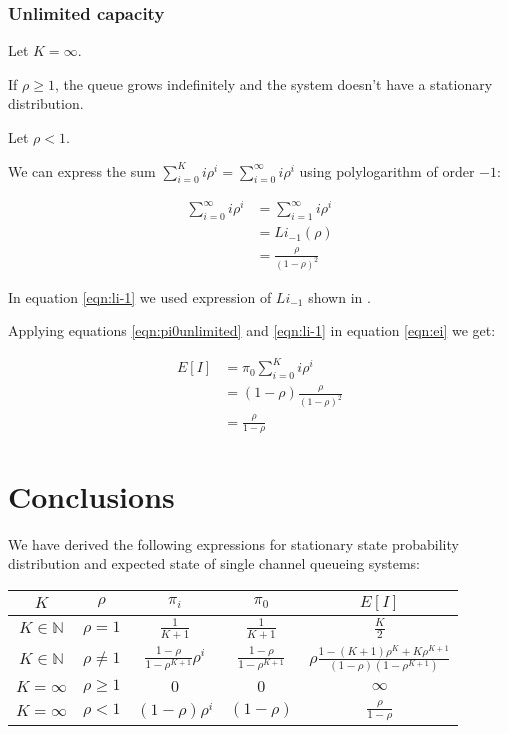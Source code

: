 \documentclass{article}
\begin{document}
\subsubsection{Unlimited capacity}

Let $K = \infty$.

If $\rho \geq 1$, the queue grows indefinitely
and the system doesn't have a stationary distribution.

Let $\rho < 1$.

We can express the sum
$\sum_{i=0}^K{i \rho^i} = \sum_{i=0}^\infty{i \rho^i}$
using polylogarithm of order $-1$:

\begin{align}
\sum_{i=0}^\infty{i \rho^i} &= \sum_{i=1}^\infty{i \rho^i} \\
&= Li_{-1}(\rho) \\
&= \frac{\rho}{(1 - \rho)^2} \label{eqn:li-1}
\end{align}

In equation \ref{eqn:li-1} we used expression of $Li_{-1}$ shown in \cite[section Particular values]{wiki:polylogarithm}.

Applying equations \ref{eqn:pi0unlimited} and \ref{eqn:li-1}
in equation \ref{eqn:ei} we get:

\begin{align}
E[I] &= \pi_0 \sum_{i=0}^K{i \rho^i} \\
&= (1 - \rho) \frac{\rho}{(1 - \rho)^2} \\
&= \frac{\rho}{1 - \rho}
\end{align}

\section{Conclusions}

We have derived the following expressions for
stationary state probability distribution and
expected state of single channel queueing systems:

\begin{tabular}{c | c || c | c | c}
$K$ & $\rho$ & $\pi_i$ & $\pi_0$ & $E[I]$ \\
\hline
$K \in \mathbb{N}$ & $\rho = 1$ & $\frac{1}{K + 1}$
& $\frac{1}{K + 1}$ & $\frac{K}{2}$ \\
$K \in \mathbb{N}$ & $\rho \neq 1$
& $\frac{1 - \rho}{1 - \rho^{K+1}} \rho^i$
& $\frac{1 - \rho}{1 - \rho^{K+1}}$
& $\rho \frac{1 - (K+1) \rho^K + K \rho^{K+1}}{(1 - \rho)(1 - \rho^{K+1})}$ \\
$K = \infty$ & $\rho \geq 1$
& $0$ & $0$ & $\infty$ \\
$K = \infty$ & $\rho < 1$
& $(1 - \rho) \rho^i$ & $(1 - \rho)$ & $\frac{\rho}{1 - \rho}$ \\
\end{tabular}
\end{document}
